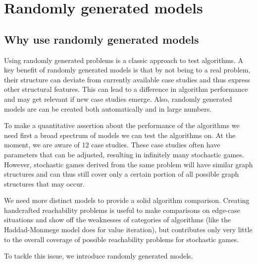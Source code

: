 \chapter{Randomly generated models} \label{ch:randomGen}
\section{Why use randomly generated models}
Using randomly generated problems is a classic approach to test algorithms.
A key benefit of randomly generated models is that by not being to a real problem, their structure can deviate from currently available case studies 
and thus express other structural features. 
This can lead to a difference in algorithm performance and may get relevant if new case studies emerge.
Also, randomly generated models are can be created both automatically and in large numbers.

To make a quantitative assertion about the performance of the algorithms we need first a broad spectrum of models we can test the algorithms on.
At the moment, we are aware of 12 case studies.
These case studies often have parameters that can be adjusted, resulting in infinitely many stochastic games.
However, stochastic games derived from the same problem will have similar graph structures and can thus still cover only a certain portion
of all possible graph structures that may occur.

We need more distinct models to provide a solid algorithm comparison.
Creating handcrafted reachability problems is useful to make comparisons on edge-case situations and 
show off the weaknesses of categories of algorithms (like the Haddad-Monmege model does for value iteration), 
but contributes only very little to the overall coverage of possible reachability problems for stochastic games.

To tackle this issue, we introduce randomly generated models.


